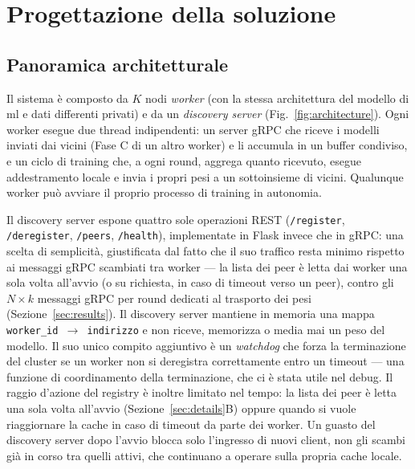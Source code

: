 \section{Progettazione della soluzione}
\label{sec:design}

\subsection{Panoramica architetturale}
Il sistema è composto da $K$ nodi \emph{worker}
(con la stessa architettura del modello di ml e dati differenti privati) e da un
\emph{discovery server} (Fig.~\ref{fig:architecture}). Ogni worker
esegue due thread indipendenti: un server gRPC che riceve i modelli inviati
dai vicini (Fase C di un altro worker) e li accumula in un buffer condiviso,
e un ciclo di training che, a ogni round, aggrega quanto ricevuto, esegue
addestramento locale e invia i propri pesi a un sottoinsieme di vicini.
Qualunque worker può avviare il proprio processo di training in autonomia.

Il discovery server espone quattro sole operazioni REST
(\texttt{/register}, \texttt{/deregister}, \texttt{/peers}, \texttt{/health}),
implementate in Flask invece che in gRPC: una scelta di semplicità,
giustificata dal fatto che il suo traffico resta minimo rispetto ai
messaggi gRPC scambiati tra worker — la lista dei peer è letta dai worker
una sola volta all'avvio (o su richiesta, in caso di timeout verso un
peer), contro gli $N \times k$ messaggi gRPC per round dedicati al trasporto
dei pesi (Sezione~\ref{sec:results}). Il discovery server
mantiene in memoria una mappa \texttt{worker\_id~$\to$~indirizzo} e non
riceve, memorizza o media mai un peso del modello. Il suo unico compito
aggiuntivo è un \emph{watchdog} che forza la terminazione del cluster se un
worker non si deregistra correttamente entro un timeout — una funzione di
coordinamento della terminazione, che ci è stata utile nel debug. Il raggio d'azione del registry
è inoltre limitato nel tempo: la lista dei peer è
letta una sola volta all'avvio (Sezione~\ref{sec:details}B) oppure quando si vuole riaggiornare la cache in caso
di timeout da parte dei worker. Un guasto del
discovery server dopo l'avvio blocca solo l'ingresso di nuovi client,
non gli scambi già in corso tra quelli attivi, che continuano a operare sulla
propria cache locale.

